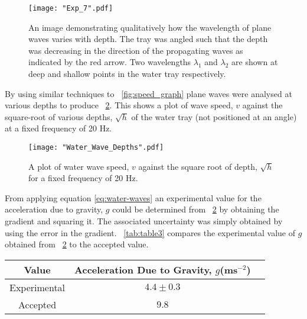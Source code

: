 \documentclass{article}
\newcommand{\figref}[2][\figurename~]{#1\ref{#2}}
\newcommand{\tabref}[2][\tablename~]{#1\ref{#2}}
\begin{document}
\begin{figure}[h]
\centering
\texttt{[image: "Exp\_7".pdf]}
\caption{An image demonstrating qualitatively how the wavelength of plane waves varies with depth. The tray was angled such that the depth was decreasing in the direction of the propagating waves as indicated by the red arrow. Two wavelengths $\lambda_1$ and $\lambda_2$ are shown at deep and shallow points in the water tray respectively.}
\label{fig:tray_depth}
\end{figure}


\vspace{2mm}
\noindent
By using similar techniques to \figref{fig:speed_graph} plane waves were analysed at various depths to produce \figref{fig:depth_graph}. This shows a plot of wave speed, $v$ against the square-root of various depths, $\sqrt{h}$ of the water tray (not positioned at an angle) at a fixed frequency of 20 Hz.

\begin{figure}[h]
\centering
\texttt{[image: "Water\_Wave\_Depths".pdf]}
\caption{A plot of water wave speed, $v$ against the square root of depth, $\sqrt{h}$ for a fixed frequency of 20 Hz.}
\label{fig:depth_graph}
\end{figure}

\newpage
\vspace{2mm}
\noindent
From applying equation \eqref{eq:water-waves} an experimental value for the acceleration due to gravity, $g$ could be determined from \figref{fig:depth_graph} by obtaining the gradient and squaring it. The associated uncertainty  was simply obtained by using the error in the gradient. \tabref{tab:table3} compares the experimental value of $g$ obtained from \figref{fig:depth_graph} to the accepted value.


\vspace{5mm}
\begin{table*}[h]
\centering %
\caption{Table of values for the acceleration due to gravity, $g$.}
\label{tab:table3}
\begin{tabular}{|c|c|c|}
\hline
Value & Acceleration Due to Gravity, $g$(ms$^{-2}$) \\
\hline
Experimental & $4.4 \pm 0.3$ \\
\hline
Accepted & $9.8$ \\
\hline
\end{tabular}
\end{table*}
\end{document}
